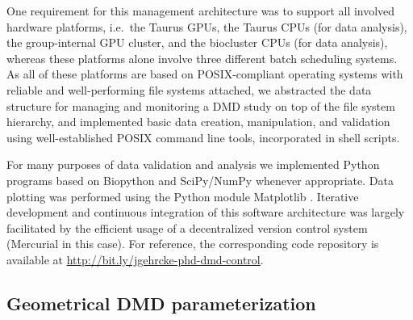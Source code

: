 One requirement for this management architecture was to support all involved
hardware platforms, i.e.\ the Taurus GPUs, the Taurus CPUs (for data analysis),
the group-internal GPU cluster, and the biocluster CPUs (for data analysis),
whereas these platforms alone involve three different batch scheduling systems.
As all of these platforms are based on POSIX-compliant operating systems with
reliable and well-performing file systems attached, we abstracted the data
structure for managing and monitoring a DMD study on top of the file system
hierarchy, and implemented basic data creation, manipulation, and validation
using well-established POSIX command line tools, incorporated in shell scripts.

For many purposes of data validation and analysis we implemented Python
programs based on Biopython \cite{biopython_web} and SciPy/NumPy
\cite{scipy_numpy} whenever appropriate. Data plotting was performed using
the Python module Matplotlib \cite{matplotlib_web}. Iterative development and
continuous integration of this software architecture was largely facilitated by
the efficient usage of a decentralized version control system (Mercurial
\cite{mercurial_web} in this case). For reference, the corresponding code
repository is available at \url{http://bit.ly/jgehrcke-phd-dmd-control}.


\subsection{Geometrical DMD parameterization}
\label{dmdil10:method_geom_setup}

